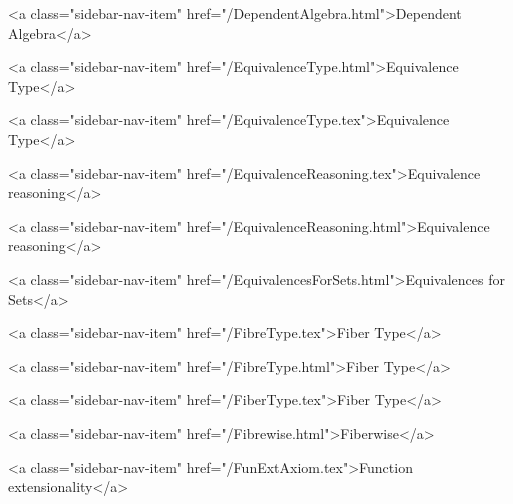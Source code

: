       
        
          <a class="sidebar-nav-item" href="/DependentAlgebra.html">Dependent Algebra</a>
        
      
    
      
        
          <a class="sidebar-nav-item" href="/EquivalenceType.html">Equivalence Type</a>
        
      
    
      
        
          <a class="sidebar-nav-item" href="/EquivalenceType.tex">Equivalence Type</a>
        
      
    
      
        
          <a class="sidebar-nav-item" href="/EquivalenceReasoning.tex">Equivalence reasoning</a>
        
      
    
      
        
          <a class="sidebar-nav-item" href="/EquivalenceReasoning.html">Equivalence reasoning</a>
        
      
    
      
        
          <a class="sidebar-nav-item" href="/EquivalencesForSets.html">Equivalences for Sets</a>
        
      
    
      
        
          <a class="sidebar-nav-item" href="/FibreType.tex">Fiber Type</a>
        
      
    
      
        
          <a class="sidebar-nav-item" href="/FibreType.html">Fiber Type</a>
        
      
    
      
        
          <a class="sidebar-nav-item" href="/FiberType.tex">Fiber Type</a>
        
      
    
      
        
          <a class="sidebar-nav-item" href="/Fibrewise.html">Fiberwise</a>
        
      
    
      
        
          <a class="sidebar-nav-item" href="/FunExtAxiom.tex">Function extensionality</a>
        
